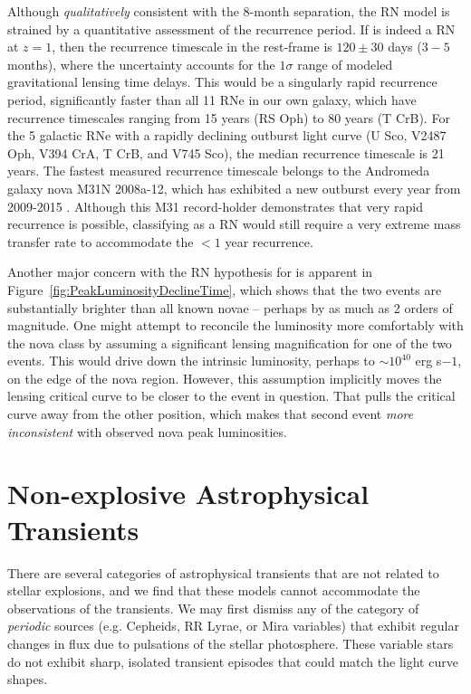 Although {\it qualitatively} consistent with the 8-month separation,
the RN model is strained by a quantitative assessment of the
recurrence period. If \spock is indeed a RN at $z=1$, then the
recurrence timescale in the rest-frame is $120\pm30$ days ($3-5$
months), where the uncertainty accounts for the $1\sigma$ range of
modeled gravitational lensing time delays.  This would be a singularly
rapid recurrence period, significantly faster than all 11 RNe in our
own galaxy, which have recurrence timescales ranging from 15 years (RS
Oph) to 80 years (T CrB). For the 5 galactic RNe with a rapidly
declining outburst light curve (U Sco, V2487 Oph, V394 CrA, T CrB, and
V745 Sco), the median recurrence timescale is 21 years.  The fastest
measured recurrence timescale belongs to the Andromeda galaxy nova
M31N 2008a-12, which has exhibited a new outburst every year from
2009-2015
\citep{Tang:2014,Darnley:2014,Darnley:2015,Henze:2015,Henze:2015a}. Although
this M31 record-holder demonstrates that very rapid recurrence is
possible, classifying \spock as a RN would still require a very
extreme mass transfer rate to accommodate the $<1$ year recurrence.

Another major concern with the RN hypothesis for \spock is apparent
in Figure~\ref{fig:PeakLuminosityDeclineTime}, which shows that the
two \spock events are substantially brighter than all known novae --
perhaps by as much as 2 orders of magnitude.  One might attempt to
reconcile the \spock luminosity more comfortably with the nova class
by assuming a significant lensing magnification for one of the two
events. This would drive down the intrinsic luminosity, perhaps to
$\sim10^{40}$ erg s${-1}$, on the edge of the nova region.  However,
this assumption implicitly moves the lensing critical curve to be
closer to the \spock event in question.  That pulls the critical curve
away from the other \spock position, which makes that second event
{\it more inconsistent} with observed nova peak luminosities.  


\section{Non-explosive Astrophysical Transients}

There are several categories of astrophysical transients that are not
related to stellar explosions, and we find that these models cannot
accommodate the observations of the \spock transients.  We may first
dismiss any of the category of {\it periodic} sources (e.g. Cepheids,
RR Lyrae, or Mira variables) that exhibit regular changes in flux due
to pulsations of the stellar photosphere. These variable stars do not
exhibit sharp, isolated transient episodes that could match the \spock
light curve shapes.


